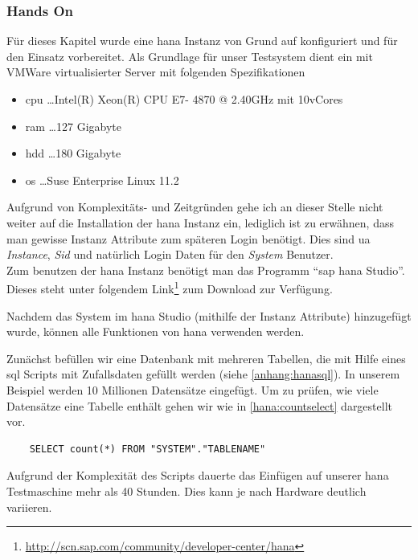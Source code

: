 \subsubsection{Hands On}
\label{sec:db-hana-ho}
Für dieses Kapitel wurde eine \gls{hana} Instanz von Grund auf konfiguriert und für den Einsatz vorbereitet. 
Als Grundlage für unser Testsystem dient ein mit VMWare virtualisierter Server mit folgenden Spezifikationen
\begin{itemize}
	\item \gls{cpu} \ldots Intel(R) Xeon(R) CPU E7- 4870  @ 2.40GHz mit 10vCores
	\item \gls{ram} \ldots 127 Gigabyte
	\item \gls{hdd} \ldots 180 Gigabyte
	\item \gls{os} \ldots Suse Enterprise Linux 11.2	
\end{itemize}

Aufgrund von Komplexitäts- und Zeitgründen gehe ich an dieser Stelle nicht weiter auf die Installation der \gls{hana} Instanz ein, lediglich ist zu erwähnen, dass man gewisse Instanz Attribute zum späteren Login benötigt. Dies sind \gls{ua} \emph{Instance}, \emph{Sid} und natürlich Login Daten für den \emph{System} Benutzer.\\
Zum benutzen der \gls{hana} Instanz benötigt man das Programm "`\gls{sap} \gls{hana} Studio"'. Dieses steht unter folgendem Link\footnote{\url{http://scn.sap.com/community/developer-center/hana}} zum Download zur Verfügung.

Nachdem das System im \gls{hana} Studio (mithilfe der Instanz Attribute) hinzugefügt wurde, können alle Funktionen von \gls{hana} verwenden werden.

Zunächst befüllen wir eine Datenbank mit mehreren Tabellen, die mit Hilfe eines \gls{sql} Scripts mit Zufallsdaten gefüllt werden (siehe \ref{anhang:hanasql}). In unserem Beispiel werden 10 Millionen Datensätze eingefügt. Um zu prüfen, wie viele Datensätze eine Tabelle enthält gehen wir wie in \ref{hana:countselect} dargestellt vor.

\begin{lstlisting}
	SELECT count(*) FROM "SYSTEM"."TABLENAME"
\end{lstlisting}

Aufgrund der Komplexität des Scripts dauerte das Einfügen auf unserer \gls{hana} Testmaschine mehr als 40 Stunden. Dies kann je nach Hardware deutlich variieren.\\

